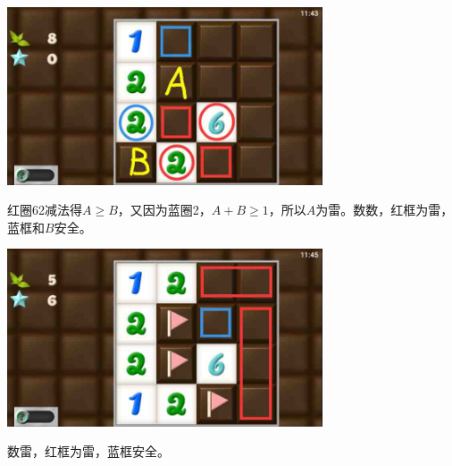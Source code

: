 \subsection{} %
\begin{center}
    \includegraphics[width=0.7\textwidth]{puzzlelow/131-1.jpg}
\end{center}
红圈62减法得$A\ge B$，又因为蓝圈2，$A+B\ge 1$，所以$A$为雷。数数，红框为雷，蓝框和$B$安全。
\begin{center}
    \includegraphics[width=0.7\textwidth]{puzzlelow/131-2.jpg}
\end{center}
数雷，红框为雷，蓝框安全。


